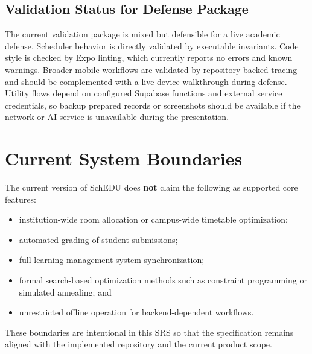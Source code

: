 \documentclass[12pt]{article}
\begin{document}
\subsection{Validation Status for Defense Package}

The current validation package is mixed but defensible for a live academic
defense. Scheduler behavior is directly validated by executable invariants. Code
style is checked by Expo linting, which currently reports no errors and known
warnings. Broader mobile workflows are validated by repository-backed tracing and
should be complemented with a live device walkthrough during defense. Utility
flows depend on configured Supabase functions and external service credentials,
so backup prepared records or screenshots should be available if the network or
AI service is unavailable during the presentation.

\section{Current System Boundaries}

The current version of SchEDU does \textbf{not} claim the following as supported
core features:
\begin{itemize}
\item institution-wide room allocation or campus-wide timetable optimization;
\item automated grading of student submissions;
\item full learning management system synchronization;
\item formal search-based optimization methods such as constraint programming or
simulated annealing; and
\item unrestricted offline operation for backend-dependent workflows.
\end{itemize}

These boundaries are intentional in this SRS so that the specification remains
aligned with the implemented repository and the current product scope.
\end{document}
